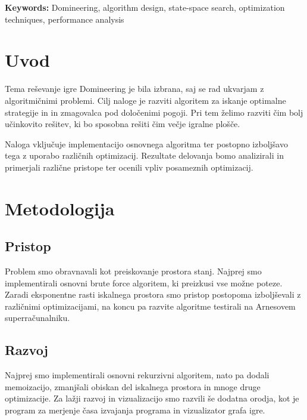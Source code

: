 \documentclass[12pt]{report}
\begin{document}
\textbf{Keywords: } Domineering, algorithm design, state-space search, optimization techniques, performance analysis

\newpage

\tableofcontents
\newpage

\renewcommand{\listalgorithmname}{Kazalo algoritmov}
\begingroup
\let\clearpage\relax
\listoffigures
\listofalgorithms
\endgroup

\newpage

\chapter{Uvod}

Tema reševanje igre Domineering je bila izbrana, saj se rad ukvarjam z algoritmičnimi problemi. Cilj naloge je razviti algoritem za iskanje optimalne strategije in in zmagovalca pod določenimi pogoji. Pri tem želimo razviti čim bolj učinkovito rešitev, ki bo sposobna rešiti čim večje igralne plošče. 

Naloga vključuje implementacijo osnovnega algoritma ter postopno izboljšavo tega z uporabo različnih optimizacij. Rezultate delovanja bomo analizirali in primerjali različne pristope ter ocenili vpliv posameznih optimizacij.

\chapter{Metodologija}

\section{Pristop}
Problem smo obravnavali kot preiskovanje prostora stanj. Najprej smo implementirali osnovni brute force algoritem, ki preizkusi vse možne poteze. Zaradi eksponentne rasti iskalnega prostora smo pristop postopoma izboljševali z različnimi optimizacijami, na koncu pa razvite algoritme testirali na Arnesovem superračunalniku.

\section{Razvoj}
Najprej smo implementirali osnovni rekurzivni algoritem, nato pa dodali memoizacijo, zmanjšali obiskan del iskalnega prostora in mnoge druge optimizacije. Za lažji razvoj in vizualizacijo smo razvili še dodatna orodja, kot je program za merjenje časa izvajanja programa in vizualizator grafa igre.
\end{document}
